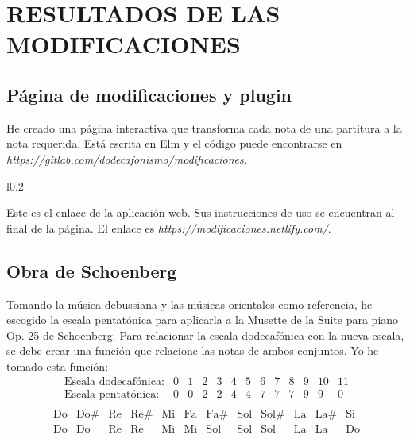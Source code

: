 	\chapter{RESULTADOS DE LAS MODIFICACIONES}
    
    \section{Página de modificaciones y plugin}
   
    He creado una página interactiva que transforma cada nota de una partitura a la nota requerida. Está escrita en Elm y el código puede encontrarse en \textit{https://gitlab.com/dodecafonismo/modificaciones}.
   
    \begin{wrapfigure}{l}{0.2\textwidth}
    	\vspace{-0.5cm}
    	\vspace{-1.5cm}
    \end{wrapfigure} Este es el enlace de la aplicación web. Sus instrucciones de uso se encuentran al final de la página. El enlace es \textit{https://modificaciones.netlify.com/}.
    
    \section{Obra de Schoenberg}
   
   	Tomando la música debussiana y las músicas orientales como referencia, he escogido la escala pentatónica para aplicarla a la Musette de la Suite para piano Op. 25 de Schoenberg. Para relacionar la escala dodecafónica con la nueva escala, se debe crear una función que relacione las notas de ambos conjuntos. Yo he tomado esta función:
   	\[\left.\begin{matrix}\text{Escala dodecafónica:}&0&1&2&3&4&5&6&7&8&9&10&11\\\text{Escala pentatónica:}&0&0&2&2&4&4&7&7&7&9&9&0\\\end{matrix}\right.\]
   	\[\left.\begin{matrix}\text{Do}&\text{Do\#}&\text{Re}&\text{Re\#}&\text{Mi}&\text{Fa}&\text{Fa\#}&\text{Sol}&\text{Sol\#}&\text{La}&\text{La\#}&\text{Si}\\\text{Do}&\text{Do}&\text{Re}&\text{Re}&\text{Mi}&\text{Mi}&\text{Sol}&\text{Sol}&\text{Sol}&\text{La}&\text{La}&\text{Do}\\\end{matrix}\right.\]
   	

